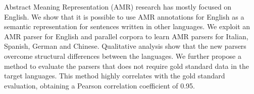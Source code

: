 Abstract Meaning Representation (AMR) research has mostly focused on English. We show that it is possible to use AMR annotations for English as a semantic representation for sentences written in other languages. We exploit an AMR parser for English and parallel corpora to learn AMR parsers for Italian, Spanish, German and Chinese. Qualitative analysis show that the new parsers overcome structural differences between the languages. We further propose a method to evaluate the parsers that does not require gold standard data in the target languages. This method highly correlates with the gold standard evaluation, obtaining a Pearson correlation coefficient of 0.95.
